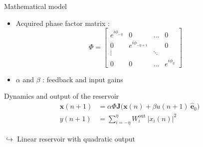 \begin{frame}{Mathematical model}
	\begin{itemize}
		\item Acquired phase factor matrix :
		\begin{equation*}
			\Phi = \begin{bmatrix}
				e^{i\phi_{-\eta}} & 0 & \dots & 0 \\
				0 & e^{i\phi_{-\eta+1}} &  & 0 \\
				\vdots &  & \ddots & \\
				0 & 0 & \dots & e^{i\phi_{\eta}}
			\end{bmatrix}
		\end{equation*}
		\item $\alpha$ and $\beta$ : feedback and input gains		
	\end{itemize}
		\begin{alertblock}{Dynamics and output of the reservoir}
			\begin{align}
				\mathbf{x}(n+1) &= \alpha \Phi \mathbf{J} \bigg ( \mathbf{x}(n) + \beta u(n+1)~\hat{\mathbf{e}}_0 \bigg ) \nonumber \\
				y(n+1) &= \sum_{i=-\eta}^\eta W_i^{\text{out}} ~ |x_i(n)|^2 \nonumber
			\end{align}	
		\end{alertblock}
		\centering
		$\hookrightarrow$ Linear reservoir with quadratic output
\end{frame}













